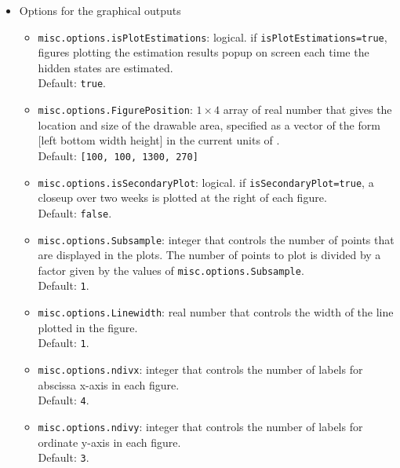 \begin{itemize}
\item Options for the graphical outputs

\begin{itemize}
\item \lstinline[basicstyle = \mlttfamily \small ]!misc.options.isPlotEstimations!: logical. if \lstinline[basicstyle = \mlttfamily \small ]!isPlotEstimations=true!, figures plotting the estimation results popup on screen each time the hidden states are estimated. \\Default: \lstinline[basicstyle = \mlttfamily \small ]!true!.
\item \lstinline[basicstyle = \mlttfamily \small ]!misc.options.FigurePosition!: $1\times4$ array of real number that gives the location and size of the drawable area, specified as a vector of the form [left bottom width height] in the current units of \MATLAB{}. \\Default: \lstinline[basicstyle = \mlttfamily \small ]![100, 100, 1300, 270]!
\item \lstinline[basicstyle = \mlttfamily \small ]!misc.options.isSecondaryPlot!: logical. if \lstinline[basicstyle = \mlttfamily \small ]!isSecondaryPlot=true!, a closeup over two weeks is plotted at the right of each figure. \\Default: \lstinline[basicstyle = \mlttfamily \small ]!false!.
\item \lstinline[basicstyle = \mlttfamily \small ]!misc.options.Subsample!: integer that controls the number of points that are displayed in the plots. The number of points to plot is divided by a factor given by the values of \lstinline[basicstyle = \mlttfamily \small ]!misc.options.Subsample!. \\Default: \lstinline[basicstyle = \mlttfamily \small ]!1!.
\item \lstinline[basicstyle = \mlttfamily \small ]!misc.options.Linewidth!: real number that controls the width of the line plotted in the figure. \\Default: \lstinline[basicstyle = \mlttfamily \small ]!1!.
\item \lstinline[basicstyle = \mlttfamily \small ]!misc.options.ndivx!: integer that controls the number of labels for abscissa x-axis in each figure. \\Default: \lstinline[basicstyle = \mlttfamily \small ]!4!.
\item \lstinline[basicstyle = \mlttfamily \small ]!misc.options.ndivy!: integer that controls the number of labels for ordinate y-axis in each figure. \\Default: \lstinline[basicstyle = \mlttfamily \small ]!3!.

\end{itemize}
\end{itemize}
